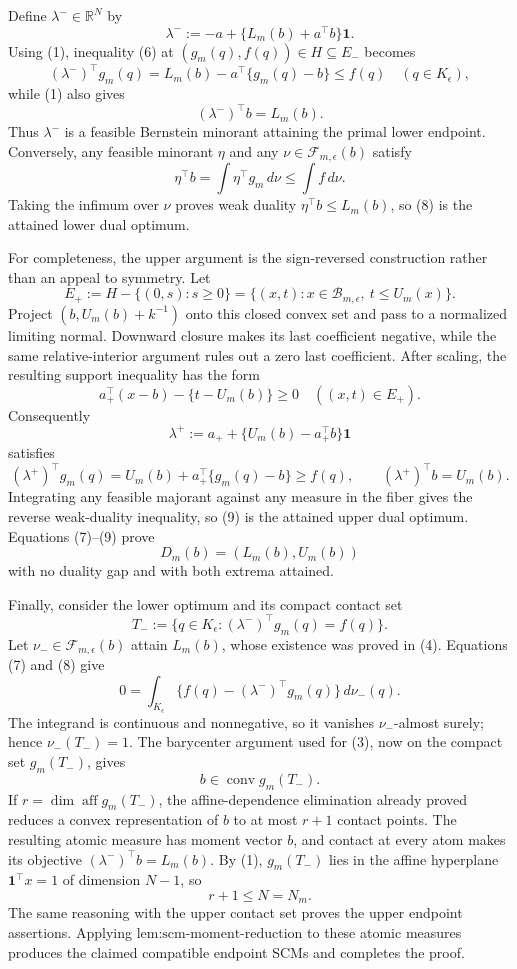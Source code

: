 Define \(\lambda^-\in\mathbb R^N\) by
\[
 \lambda^-:=-a+\{L_m(b)+a^{\top}b\}\mathbf 1.
\]
Using (1), inequality (6) at \((g_m(q),f(q))\in H\subseteq E_-\) becomes
\[
 (\lambda^-)^{\top}g_m(q)
 =L_m(b)-a^{\top}\{g_m(q)-b\}
 \leq f(q)
 \quad(q\in K_{\epsilon}),
\tag{7}
\]
while (1) also gives
\[
 (\lambda^-)^{\top}b=L_m(b).
\tag{8}
\]
Thus \(\lambda^-\) is a feasible Bernstein minorant attaining the primal lower endpoint. Conversely, any feasible minorant \(\eta\) and any \(\nu\in\mathcal F_{m,\epsilon}(b)\) satisfy
\[
 \eta^{\top}b
 =\int\eta^{\top}g_m\,d\nu
 \leq\int f\,d\nu.
\]
Taking the infimum over \(\nu\) proves weak duality \(\eta^{\top}b\leq L_m(b)\), so (8) is the attained lower dual optimum.

For completeness, the upper argument is the sign-reversed construction rather than an appeal to symmetry. Let
\[
 E_+:=H-\{(0,s):s\geq0\}
 =\{(x,t):x\in\mathcal B_{m,\epsilon},\ t\leq U_m(x)\}.
\]
Project \((b,U_m(b)+k^{-1})\) onto this closed convex set and pass to a normalized limiting normal. Downward closure makes its last coefficient negative, while the same relative-interior argument rules out a zero last coefficient. After scaling, the resulting support inequality has the form
\[
 a_+^{\top}(x-b)-\{t-U_m(b)\}\geq0
 \quad((x,t)\in E_+).
\]
Consequently
\[
 \lambda^+:=a_++\{U_m(b)-a_+^{\top}b\}\mathbf 1
\]
satisfies
\[
 (\lambda^+)^{\top}g_m(q)
 =U_m(b)+a_+^{\top}\{g_m(q)-b\}
 \geq f(q),
 \qquad
 (\lambda^+)^{\top}b=U_m(b).
\tag{9}
\]
Integrating any feasible majorant against any measure in the fiber gives the reverse weak-duality inequality, so (9) is the attained upper dual optimum. Equations (7)--(9) prove
\[
 D_m(b)=(L_m(b),U_m(b))
\]
with no duality gap and with both extrema attained.

Finally, consider the lower optimum and its compact contact set
\[
 T_-:=\{q\in K_{\epsilon}:(\lambda^-)^{\top}g_m(q)=f(q)\}.
\]
Let \(\nu_-\in\mathcal F_{m,\epsilon}(b)\) attain \(L_m(b)\), whose existence was proved in (4). Equations (7) and (8) give
\[
 0=\int_{K_{\epsilon}}
 \{f(q)-(\lambda^-)^{\top}g_m(q)\}\,d\nu_-(q).
\]
The integrand is continuous and nonnegative, so it vanishes \(\nu_-\)-almost surely; hence \(\nu_-(T_-)=1\). The barycenter argument used for (3), now on the compact set \(g_m(T_-)\), gives
\[
 b\in\operatorname{conv}g_m(T_-).
\]
If \(r=\dim\operatorname{aff}g_m(T_-)\), the affine-dependence elimination already proved reduces a convex representation of \(b\) to at most \(r+1\) contact points. The resulting atomic measure has moment vector \(b\), and contact at every atom makes its objective \((\lambda^-)^{\top}b=L_m(b)\). By (1), \(g_m(T_-)\) lies in the affine hyperplane \(\mathbf 1^{\top}x=1\) of dimension \(N-1\), so
\[
 r+1\leq N=N_m.
\]
The same reasoning with the upper contact set proves the upper endpoint assertions. Applying \(\text{lem:scm-moment-reduction}\) to these atomic measures produces the claimed compatible endpoint SCMs and completes the proof.